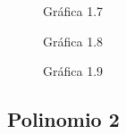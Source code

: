 \documentclass[6pt]{article}
\begin{document}
\begin{figure}[htpb]
	\centering
	
	\caption{Gráfica 1.7}
\end{figure}

\begin{figure}[htpb]
	\centering
	
	\caption{Gráfica 1.8}
\end{figure}

\begin{figure}[htpb]
	\centering
	
	\caption{Gráfica 1.9}
\end{figure}
\newpage
\subsection{Polinomio 2}
\end{document}
